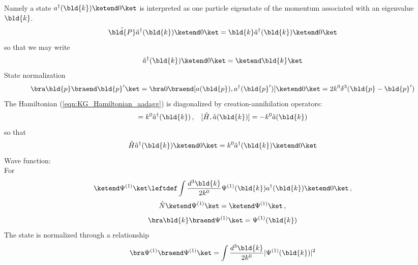 Namely a state $a^\dagger({\bld{k}})\ketend 0 \ket$ is interpreted as
one particle eigenstate of the momentum associated with an eigenvalue $\bld{k}$.
\begin{equation}
\hat{\bld{P}} \hat{a}^\dagger(\bld{k}) \ketend 0 \ket
=
\bld{k} \hat{a}^\dagger(\bld{k}) \ketend 0 \ket
\end{equation}
so that we may write
\begin{equation}
\hat{a}^\dagger(\bld{k}) \ketend 0 \ket = \ketend \bld{k} \ket
\end{equation}
State normalization
\[
\bra \bld{p} \braend \bld{p}' \ket
= \bra 0 \braend [a(\bld{p}), a^\dagger(\bld{p}')] \ketend 0 \ket
= 2 k^0 \delta^3 (\bld{p} - \bld{p}')
\]
The Hamiltonian (\ref{eqn:KG_Hamiltonian_aadagg}) is diagonalized
by creation-annihilation operators:
\begin{equation}
[ \hat{H}, \hat{a}^\dagger(\bld{k}) ] = k^0 \hat{a}^\dagger(\bld{k})
\,, \hspace{3mm}
[ \hat{H}, \hat{a}(\bld{k}) ] = - k^0 \hat{a}(\bld{k})
\label{eqn:KGcommHanda}
\end{equation}
so that
\begin{equation}
\hat{H} \hat{a}^\dagger(\bld{k}) \ketend 0 \ket
=
k^0 \hat{a}^\dagger(\bld{k}) \ketend 0 \ket
\end{equation}
Wave function:\\
For
\begin{equation*}
\ketend \Psi^{(1)} \ket
\leftdef
\int \frac{d^3 \bld{k}}{2k^0}  \Psi^{(1)} (\bld{k}) a^\dagger(\bld{k}) \ketend 0 \ket\,,
\end{equation*}
\begin{equation*}
\hat{N} \ketend \Psi^{(1)} \ket = \ketend \Psi^{(1)} \ket\,,
\end{equation*}
\begin{equation*}
\bra \bld{k} \braend \Psi^{(1)} \ket
=  \Psi^{(1)} (\bld{k})
\end{equation*}
The state is normalized through a relationship
\begin{eqnarray*}
\bra \Psi^{(1)} \braend \Psi^{(1)} \ket
=
\int \frac{d^3 \bld{k}}{2k^0}  |\Psi^{(1)}(\bld{k})|^2
\end{eqnarray*}

